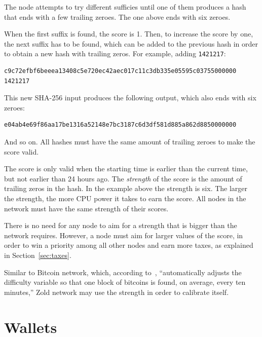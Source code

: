 \documentclass[11pt,oneside]{article}
\newcommand\dd[1]{\colorbox{gray!30}{\texttt{#1}}}
\begin{document}
The node attempts to try different sufficies until one of them produces
a hash that ends with a few trailing zeroes. The one above ends
with six zeroes.

When the first suffix is found, the score is 1. Then, to
increase the score by one, the next suffix has to be found, which
can be added to the previous hash
in order to obtain a new hash with trailing zeros. For example,
adding \dd{1421217}:

\begin{verbatim}
c9c72efbf6beeea13408c5e720ec42aec017c11c3db335e05595c03755000000 1421217
\end{verbatim}

This new SHA-256 input produces the following output, which also
ends with six zeroes:

\begin{verbatim}
e04ab4e69f86aa17be1316a52148e7bc3187c6d3df581d885a862d8850000000
\end{verbatim}

And so on. All hashes must have the same amount of trailing zeroes to make
the score valid.

The score is only valid when the starting time is earlier than
the current time, but not earlier than 24 hours ago. The \emph{strength} of the score
is the amount of trailing zeros in the hash. In the example above the
strength is six. The larger the strength, the more CPU power it takes to earn
the score. All nodes in the network must have the same strength of their scores.

There is no need for any node to aim for a strength that is bigger than the network requires.
However, a node must aim for larger values of the score, in order
to win a priority among all other nodes and earn more taxes,
as explained in Section~\ref{sec:taxes}.

Similar to Bitcoin network, which, according to~\textcite{hayes2017},
``automatically adjusts the difficulty
variable so that one block of bitcoins is found, on average, every ten minutes,''
Zold network may use the strength in order to calibrate itself.

\section{Wallets}\label{sec:wallets}
\end{document}
